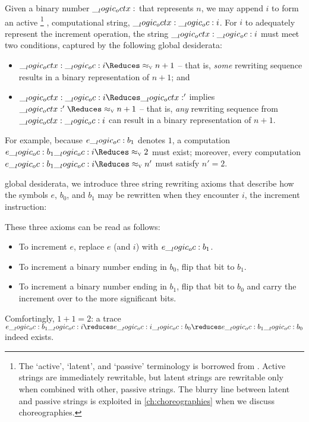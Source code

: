Given a binary number $\__logic_octx:$ that represents $n$, we may append $i$ to form an active%
\footnote{The \enquote*{active}, \enquote*{latent}, and \enquote*{passive} terminology is borrowed from \textcite{Pfenning+Simmons:LICS09}.
  Active strings are immediately rewritable, but latent strings are rewritable only when combined with other, passive strings.
  The blurry line between latent and passive strings is exploited in \cref{ch:choreographies} when we discuss choreographies.}%
, computational string, $\__logic_octx: \__logic_oc: i$.
For $i$ to adequately represent the increment operation, the string $\__logic_octx: \__logic_oc: i$ must meet two conditions, captured by the following global desiderata:
  \begin{itemize}%
  \item
    $\octx \oc i \Reduces\aval{}{n+1}$ -- that is, \emph{some} rewriting sequence results in a binary representation of $n+1$; and
  \item
    $\octx \oc i \Reduces \octx'$ implies $\octx' \Reduces\aval{}{n+1}$ -- that is, \emph{any} rewriting sequence from $\__logic_octx: \__logic_oc: i$ can result in a binary representation of $n+1$.
  \end{itemize}
For example, because $e \__logic_oc: b_1$ denotes $1$, a computation $e \oc b_1 \oc i \Reduces\aval{}{2}$ must exist; moreover, every computation $e \oc b_1 \oc i \Reduces\aval{}{n'}$ must satisfy $n' = 2$.

 global desiderata, we introduce three string rewriting axioms that describe how the symbols $e$, $b_0$, and $b_1$ may be rewritten when they encounter $i$, the increment instruction:
These three axioms can be read as follows:
\begin{itemize}
\item
  To increment $e$, replace $e$ (and $i$) with $e \__logic_oc: b_1$.
\item
  To increment a binary number ending in $b_0$, flip that bit to $b_1$.
\item
  To increment a binary number ending in $b_1$, flip that bit to $b_0$ and carry the increment over to the more significant bits.
\end{itemize}
Comfortingly, $1+1 = 2$: a trace $e \oc b_1 \oc i \reduces e \oc i \oc b_0 \reduces e \oc b_1 \oc b_0$ indeed exists.

